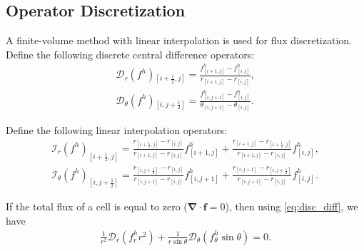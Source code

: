 \documentclass[MSc,beforeExam]{iitcsthesis}
\newcommand{\pars}[1]{\left(#1\right)}
\newcommand{\half}{\frac{1}{2}}
\newcommand\bnabla{\boldsymbol{\nabla}}
\newcommand\cI{\mathcal{I}}
\newcommand\cD{\mathcal{D}}
\begin{document}
\subsection{Operator Discretization} 
A finite-volume method with linear interpolation is used for flux discretization. 
Define the following discrete central difference operators:
\begin{align} \label{eq:disc_diff}
\cD_r(f^h){}_{\left[i+\half,j\right]} = \frac{f^h_{\left[i+1,j\right]} - f^h_{\left[i,j\right]}}
                       {r_{\left[i+1,j\right]} - r_{\left[i,j\right]}}, \\
\cD_\theta(f^h){}_{\left[i,j+\half\right]} = \frac{f^h_{\left[i,j+1\right]} - f^h_{\left[i,j\right]}}
					   {\theta_{\left[i,j+1\right]} - \theta_{\left[i,j\right]}}.
\end{align}

Define the following linear interpolation operators:
\begin{align} \label{eq:disc_interp}
\cI_r(f^h)_{\left[i+\half,j\right]} = 
\frac{r_{\left[i+\half,j\right]} - r_{\left[i,j\right]}}
{r_{\left[i+1,j\right]} - r_{\left[i,j\right]}} 
f^h_{\left[i+1,j\right]} 
+ 
\frac{r_{\left[i+1,j\right]} - r_{\left[i+\half,j\right]}}
{r_{\left[i+1,j\right]} - r_{\left[i,j\right]}}
f^h_{\left[i,j\right]},
\\
\cI_\theta(f^h)_{\left[i,j+\half\right]} =
\frac{r_{\left[i,j+\half\right]} - r_{\left[i,j\right]}}
{r_{\left[i,j+1\right]} - r_{\left[i,j\right]}}
  f^h_{\left[i,j+1\right]} + 
\frac{ r_{\left[i,j+1\right]} - r_{\left[i,j+\half\right]}}
{r_{\left[i,j+1\right]} - r_{\left[i,j\right]}}
  f^h_{\left[i,j\right]}.
\end{align}

If the total flux of a cell is equal to zero ($\bnabla \cdot \boldsymbol{f} = 0$), 
then using \eqref{eq:disc_diff}, we have
\begin{eqnarray}
\frac{1}{r^2} \cD_r\pars{f^h_r r^2} + 
\frac{1}{r \sin\theta} \cD_\theta\pars{f^h_\theta \sin\theta} = 0. 
\end{eqnarray}
\end{document}
